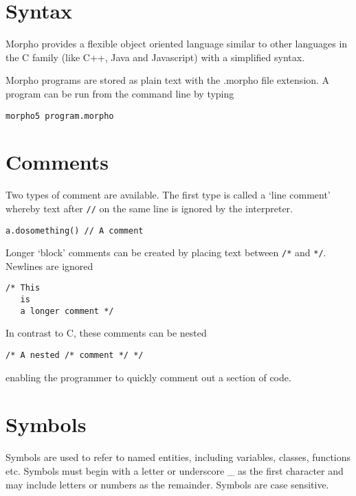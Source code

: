 \hypertarget{syntax}{%
\section{Syntax}\label{syntax}}

Morpho provides a flexible object oriented language similar to other
languages in the C family (like C++, Java and Javascript) with a
simplified syntax.

Morpho programs are stored as plain text with the .morpho file
extension. A program can be run from the command line by typing

\begin{lstlisting}
morpho5 program.morpho
\end{lstlisting}

\hypertarget{comments}{%
\section{Comments}\label{comments}}

Two types of comment are available. The first type is called a `line
comment' whereby text after \texttt{//} on the same line is ignored by
the interpreter.

\begin{lstlisting}
a.dosomething() // A comment
\end{lstlisting}

Longer `block' comments can be created by placing text between
\texttt{/*} and \texttt{*/}. Newlines are ignored

\begin{lstlisting}
/* This
   is
   a longer comment */
\end{lstlisting}

In contrast to C, these comments can be nested

\begin{lstlisting}
/* A nested /* comment */ */
\end{lstlisting}

enabling the programmer to quickly comment out a section of code.

\hypertarget{symbols}{%
\section{Symbols}\label{symbols}}

Symbols are used to refer to named entities, including variables,
classes, functions etc. Symbols must begin with a letter or underscore
\_ as the first character and may include letters or numbers as the
remainder. Symbols are case sensitive.

